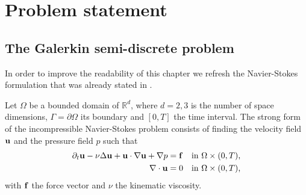 

\section{Problem statement}
\label{sec-C4_prob_statement}
\subsection{The Galerkin semi-discrete problem}
\label{subsec-C4_NS_formulation}
In order to improve the readability of this chapter we refresh the Navier-Stokes formulation that was already stated in . 

Let $\Omega$ be a bounded domain of $\mathbb{R}^d$, where $d=2,3$ is the number of space dimensions, $\Gamma=\partial\Omega$ its boundary and $[0,T]$ the time interval. The strong form of the incompressible Navier-Stokes problem consists of finding the velocity field ${\bf u}$ and the pressure field $p$ such that 
\begin{align}
\label{eq-C4_NS_strong_mome}
\partial_t{\bf u}-\nu\Delta{\bf u}+{\bf u}\cdot\nabla{\bf u}+\nabla p&={\bf f}&\mbox{in $\Omega\times(0,T)$,}\\
\label{eq-C4_NS_strong_inc}
\nabla\cdot{\bf u}&=0&\mbox{in $\Omega\times(0,T)$,}
\end{align}
with ${\bf f}$ the force vector and $\nu$ the kinematic viscosity. 

